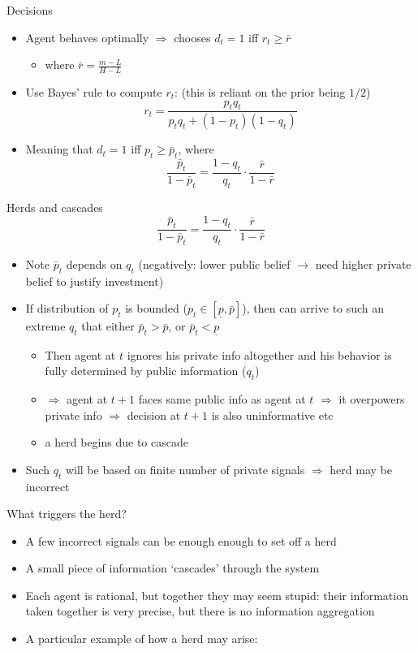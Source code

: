 \documentclass[english,10pt
,aspectratio=169
]{beamer}
\begin{document}
\begin{frame}{Decisions}
	\begin{itemize}
		\item Agent behaves optimally $\Rightarrow$ chooses $d_t=1$ iff $r_t \geq \bar{r}$
		\begin{itemize}
			\item where $\bar{r} = \frac{m-L}{H-L}$
		\end{itemize}
		\item Use Bayes' rule to compute $r_t$: (this is reliant on the prior being $1/2$)
		\[r_t = \frac{p_t q_t}{p_t q_t + (1-p_t) (1-q_t)}\]
		\item Meaning that $d_t = 1$ iff $p_t \geq \bar{p}_t$, where
		\[ \frac{\bar{p}_t}{1-\bar{p}_t} = \frac{1-q_t}{q_t} \cdot \frac{\bar{r}}{1-\bar{r}} \]
	\end{itemize}
\end{frame}


\begin{frame}{Herds and cascades}
	\[ \frac{\bar{p}_t}{1-\bar{p}_t} = \frac{1-q_t}{q_t} \cdot \frac{\bar{r}}{1-\bar{r}} \]
	\vspace{-1em}
	\begin{itemize}
		\item Note $\bar{p}_t$ depends on $q_t$ (negatively: lower public belief $\to$ need higher private belief to justify investment)
		\item If distribution of $p_t$ is bounded ($p_t \in [\underline{p},\bar{p}]$), then can arrive to such an extreme $q_t$ that either $\bar{p}_t > \bar{p}$, or $\bar{p}_t < \underline{p}$
		\begin{itemize}
			\item Then agent at $t$ ignores his private info altogether and his behavior is fully determined by public information ($q_t$)
			\item $\Rightarrow$ agent at $t+1$ faces same public info as agent at $t$ $\Rightarrow$ it overpowers private info $\Rightarrow$ decision at $t+1$ is also uninformative etc
			\item a \alert{herd} begins due to cascade
		\end{itemize}
		\item Such $q_t$ will be based on finite number of private signals $\Rightarrow$ \alert{herd may be incorrect}
	\end{itemize}
\end{frame}


\begin{frame}{What triggers the herd?} \label{HERD}
	\begin{itemize}
		\item A few incorrect signals can be enough enough to set off a herd
		\item A small piece of information `cascades' through the system
		\item Each agent is rational, but together they may seem stupid: their information taken together is very precise, but there is no information aggregation
		\item A particular example of how a herd may arise: \hyperlink{EXP}{}
	\end{itemize}
\end{frame}
\end{document}
